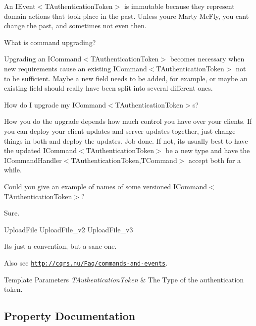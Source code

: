 An I\+Event$<$\+T\+Authentication\+Token$>$ is immutable because they represent domain actions that took place in the past. Unless you\textquotesingle{}re Marty Mc\+Fly, you can\textquotesingle{}t change the past, and sometimes not even then.

What is command upgrading?

Upgrading an I\+Command$<$\+T\+Authentication\+Token$>$ becomes necessary when new requirements cause an existing I\+Command$<$\+T\+Authentication\+Token$>$ not to be sufficient. Maybe a new field needs to be added, for example, or maybe an existing field should really have been split into several different ones.

How do I upgrade my I\+Command$<$\+T\+Authentication\+Token$>$s?

How you do the upgrade depends how much control you have over your clients. If you can deploy your client updates and server updates together, just change things in both and deploy the updates. Job done. If not, it\textquotesingle{}s usually best to have the updated I\+Command$<$\+T\+Authentication\+Token$>$ be a new type and have the I\+Command\+Handler$<$\+T\+Authentication\+Token,\+T\+Command$>$ accept both for a while.

Could you give an example of names of some versioned I\+Command$<$\+T\+Authentication\+Token$>$?

Sure.

Upload\+File Upload\+File\+\_\+v2 Upload\+File\+\_\+v3

It\textquotesingle{}s just a convention, but a sane one. 

 Also see \href{http://cqrs.nu/Faq/commands-and-events}{\tt http\+://cqrs.\+nu/\+Faq/commands-\/and-\/events}. 


\begin{DoxyTemplParams}{Template Parameters}
{\em T\+Authentication\+Token} & The Type of the authentication token.\\
\hline
\end{DoxyTemplParams}


\subsection{Property Documentation}
\mbox{\label{interfaceCqrs_1_1Events_1_1IEvent_a2974e13d307c62c5cc438d668ff1783b_a2974e13d307c62c5cc438d668ff1783b}} 
